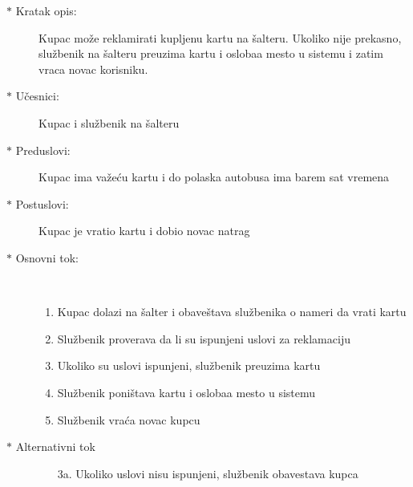 \begin{description}
  \item[$\ast$ Kratak opis: ] Kupac mo\v ze reklamirati kupljenu kartu na \v salteru. Ukoliko nije prekasno, slu\v zbenik na \v salteru preuzima kartu i osloba\dj a mesto u sistemu i zatim vraca novac korisniku.
  \item[$\ast$ U\v cesnici: ] Kupac i slu\v zbenik na \v salteru
  \item[$\ast$ Preduslovi: ] Kupac ima va\v ze\'cu kartu i do polaska autobusa ima barem sat vremena
  \item[$\ast$ Postuslovi: ] Kupac je vratio kartu i dobio novac natrag
  \item[$\ast$ Osnovni tok: ] \ \\
  \begin{enumerate}
    \item Kupac dolazi na \v salter i obave\v stava slu\v zbenika o nameri da vrati kartu
    \item Slu\v zbenik proverava da li su ispunjeni uslovi za reklamaciju
    \item Ukoliko su uslovi ispunjeni, slu\v zbenik preuzima kartu
    \item Slu\v zbenik poni\v stava kartu i osloba\dj a mesto u sistemu
    \item Slu\v zbenik vra\'ca novac kupcu
  \end{enumerate}
  \item[$\ast$ Alternativni tok]
  \begin{enumerate}
    \item[3a. ]  Ukoliko uslovi nisu ispunjeni, slu\v zbenik obavestava kupca
  \end{enumerate}
  
\end{description}

